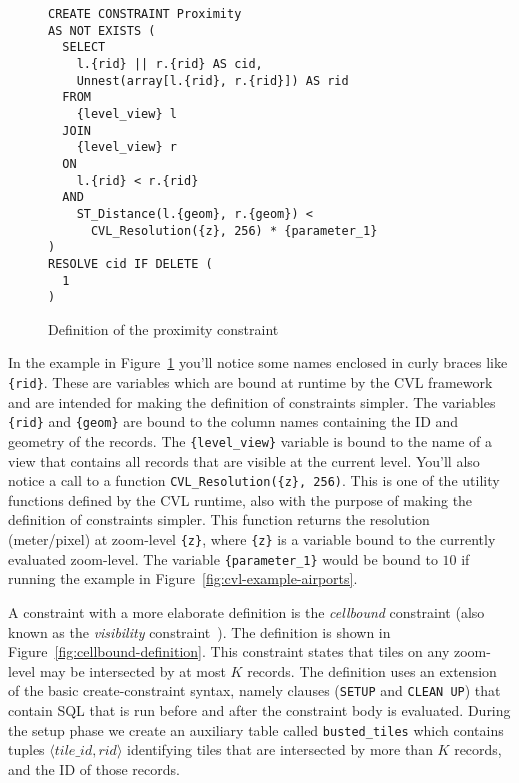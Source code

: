 \begin{figure}[htbp]
\begin{center}
\begin{lstlisting}
CREATE CONSTRAINT Proximity
AS NOT EXISTS (
  SELECT 
    l.{rid} || r.{rid} AS cid,
    Unnest(array[l.{rid}, r.{rid}]) AS rid
  FROM
    {level_view} l
  JOIN
    {level_view} r
  ON
    l.{rid} < r.{rid}
  AND
    ST_Distance(l.{geom}, r.{geom}) <
      CVL_Resolution({z}, 256) * {parameter_1}
)
RESOLVE cid IF DELETE (
  1
)
\end{lstlisting}
\caption{Definition of the proximity constraint}
\label{fig:proximity-definition}
\end{center}
\end{figure}

In the example in Figure~\ref{fig:proximity-definition} you'll notice some names enclosed in curly braces like \texttt{\{rid\}}. These are variables which are bound at runtime by the CVL framework and are intended for making the definition of constraints simpler. The variables \texttt{\{rid\}} and \texttt{\{geom\}} are bound to the column names containing the ID and geometry of the records. The \texttt{\{level\_view\}} variable is bound to the name of a view that contains all records that are visible at the current level. You'll also notice a call to a function \texttt{CVL\_Resolution(\{z\}, 256)}. This is one of the utility functions defined by the CVL runtime, also with the purpose of making the definition of constraints simpler. This function returns the resolution (meter/pixel) at zoom-level \texttt{\{z\}}, where \texttt{\{z\}} is a variable bound to the currently evaluated zoom-level. The variable \texttt{\{parameter\_1\}} would be bound to $10$ if running the example in Figure~\ref{fig:cvl-example-airports}.

A constraint with a more elaborate definition is the \emph{cellbound} constraint (also known as the \emph{visibility} constraint~\cite{sarma2012fusiontables}). The definition is shown in Figure~\ref{fig:cellbound-definition}. This constraint states that tiles on any zoom-level may be intersected by at most $K$ records. The definition uses an extension of the basic create-constraint syntax, namely clauses (\texttt{SETUP} and \texttt{CLEAN UP}) that contain SQL that is run before and after the constraint body is evaluated. During the setup phase we create an auxiliary table called \texttt{busted\_tiles} which contains tuples $\langle tile\_id, rid \rangle$ identifying tiles that are intersected by more than $K$ records, and the ID of those records. 

